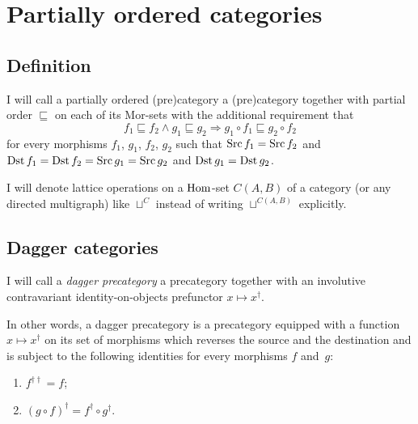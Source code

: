 \section{Partially ordered categories}


\subsection{Definition}
\begin{defn}
I
will call a partially ordered (pre)category a (pre)category together
with partial order $\sqsubseteq$ on each of its Mor-sets with the
additional requirement that
\[
f_{1}\sqsubseteq f_{2}\land g_{1}\sqsubseteq g_{2}\Rightarrow g_{1}\circ f_{1}\sqsubseteq g_{2}\circ f_{2}
\]
for every morphisms $f_{1}$, $g_{1}$, $f_{2}$, $g_{2}$ such that
$\operatorname{Src} f_{1}=\operatorname{Src} f_{2}$ and $\operatorname{Dst} f_{1}=\operatorname{Dst} f_{2}=\operatorname{Src} g_{1}=\operatorname{Src} g_{2}$
and $\operatorname{Dst} g_{1}=\operatorname{Dst} g_{2}$.
\end{defn}
I will denote lattice operations on a $\operatorname{Hom}$-set $C(A,B)$ of a category
(or any directed multigraph) like $\sqcup^{C}$ instead of writing
$\sqcup^{C(A,B)}$ explicitly.


\subsection{Dagger categories}
\begin{defn}
I will call a \emph{dagger precategory}
a precategory together with an involutive contravariant identity-on-objects
prefunctor $x\mapsto x^{\dagger}$.

In other words, a dagger precategory is a precategory equipped with
a function $x\mapsto x^{\dagger}$ on its set of morphisms which reverses
the source and the destination and is subject to the following identities
for every morphisms $f$ and~$g$:
\begin{enumerate}
\item $f^{\dagger\dagger}=f$;
\item $(g\circ f)^{\dagger}=f^{\dagger}\circ g^{\dagger}$.
\end{enumerate}
\end{defn}

